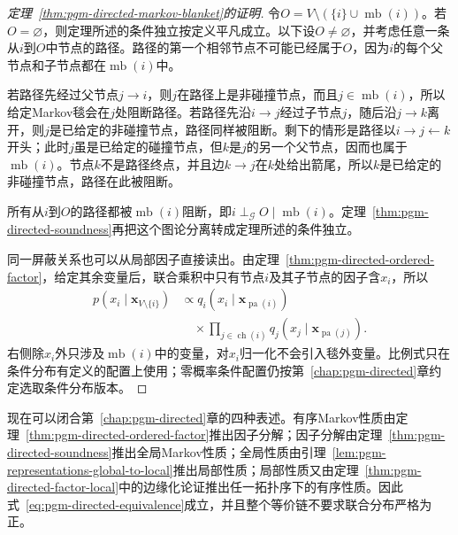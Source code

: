 \begin{proof}[定理~\ref{thm:pgm-directed-markov-blanket}的证明]
令$O=V\setminus(\{i\}\cup\operatorname{mb}(i))$。若$O=\varnothing$，则定理所述的条件独立按定义平凡成立。以下设$O\neq\varnothing$，并考虑任意一条从$i$到$O$中节点的路径。路径的第一个相邻节点不可能已经属于$O$，因为$i$的每个父节点和子节点都在$\operatorname{mb}(i)$中。

若路径先经过父节点$j\to i$，则$j$在路径上是非碰撞节点，而且$j\in\operatorname{mb}(i)$，所以给定Markov毯会在$j$处阻断路径。若路径先沿$i\to j$经过子节点$j$，随后沿$j\to k$离开，则$j$是已给定的非碰撞节点，路径同样被阻断。剩下的情形是路径以$i\to j\leftarrow k$开头；此时$j$虽是已给定的碰撞节点，但$k$是$j$的另一个父节点，因而也属于$\operatorname{mb}(i)$。节点$k$不是路径终点，并且边$k\to j$在$k$处给出箭尾，所以$k$是已给定的非碰撞节点，路径在此被阻断。

所有从$i$到$O$的路径都被$\operatorname{mb}(i)$阻断，即$i\perp_{\mathcal G}O\mid\operatorname{mb}(i)$。定理~\ref{thm:pgm-directed-soundness}再把这个图论分离转成定理所述的条件独立。

同一屏蔽关系也可以从局部因子直接读出。由定理~\ref{thm:pgm-directed-ordered-factor}，给定其余变量后，联合乘积中只有节点$i$及其子节点的因子含$x_i$，所以
\begin{equation}
  \begin{aligned}
    p(x_i\mid\bm{x}_{V\setminus\{i\}})
      &\propto q_i(x_i\mid\bm{x}_{\operatorname{pa}(i)})\\
      &\quad{}\times
      \prod_{j\in\operatorname{ch}(i)}
        q_j(x_j\mid\bm{x}_{\operatorname{pa}(j)}).
  \end{aligned}
  \label{eq:pgm-directed-blanket-conditional}
\end{equation}
右侧除$x_i$外只涉及$\operatorname{mb}(i)$中的变量，对$x_i$归一化不会引入毯外变量。比例式只在条件分布有定义的配置上使用；零概率条件配置仍按第~\ref{chap:pgm-directed}章约定选取条件分布版本。
\end{proof}

现在可以闭合第~\ref{chap:pgm-directed}章的四种表述。有序Markov性质由定理~\ref{thm:pgm-directed-ordered-factor}推出因子分解；因子分解由定理~\ref{thm:pgm-directed-soundness}推出全局Markov性质；全局性质由引理~\ref{lem:pgm-representations-global-to-local}推出局部性质；局部性质又由定理~\ref{thm:pgm-directed-factor-local}中的边缘化论证推出任一拓扑序下的有序性质。因此式~\eqref{eq:pgm-directed-equivalence}成立，并且整个等价链不要求联合分布严格为正。

